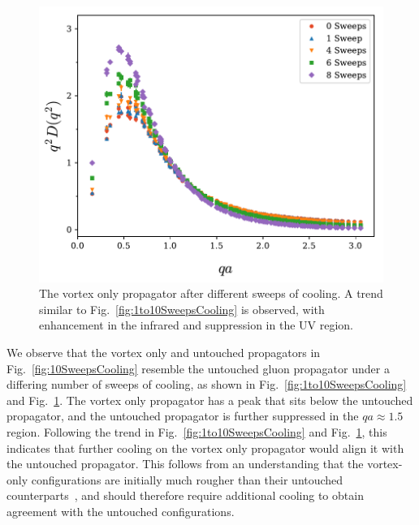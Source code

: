 %
\begin{figure}[H]
\centering
\includegraphics[width=\linewidth]{./ScalarGluComp_q2_1to10sweepsVO.pdf}
\caption[The vortex only propagator after different sweeps of cooling.]{\label{fig:1to10VO}The vortex only propagator after different sweeps of cooling. A trend similar to Fig.~\ref{fig:1to10SweepsCooling} is observed, with enhancement in the infrared and suppression in the UV region.}
\end{figure}
%
We observe that the vortex only and untouched propagators in Fig.~\ref{fig:10SweepsCooling} resemble the untouched gluon propagator under a differing number of sweeps of cooling, as shown in Fig.~\ref{fig:1to10SweepsCooling} and Fig.~\ref{fig:1to10VO}. The vortex only propagator has a peak that sits below the untouched propagator, and the untouched propagator is further suppressed in the $qa\approx 1.5$ region. Following the trend in Fig.~\ref{fig:1to10SweepsCooling} and Fig.~\ref{fig:1to10VO}, this indicates that further cooling on the vortex only propagator would align it with the untouched propagator. This follows from an understanding that the vortex-only configurations are initially much rougher than their untouched counterparts~\cite{Trewartha:2015nna}, and should therefore require additional cooling to obtain agreement with the untouched configurations.\\
\clearpage

